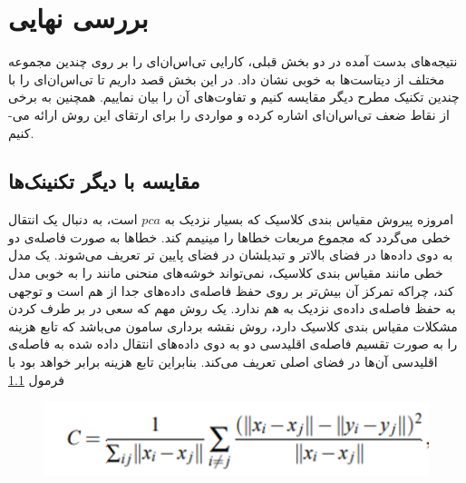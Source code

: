 \chapter{بررسی نهایی}
نتیجه‌های بدست آمده در دو بخش قبلی، کارایی تی‌اس‌ان‌ای را بر روی چندین مجموعه مختلف از دیتاست‌ها به خوبی نشان داد. در این بخش قصد داریم تا تی‌اس‌ان‌ای را با چندین تکنیک مطرح دیگر مقایسه کنیم و تفاوت‌های آن را بیان نماییم. همچنین به برخی از نقاط ضعف تی‌اس‌ان‌ای اشاره کرده و مواردی را برای ارتقای این روش ارائه می-کنیم.

\section{مقایسه با دیگر تکنینک‌ها}

امروزه پیروش
مقیاس بندی کلاسیک
که بسیار نزدیک به ‌$pca$ است، به دنبال یک انتقال خطی می‌گردد که مجموع مربعات خطاها را مینیمم کند. خطاها به صورت فاصله‌ی دو به دوی داده‌ها در فضای بالاتر و تبدیلشان در فضای پایین تر تعریف می‌شوند. یک مدل خطی مانند مقیاس بندی کلاسیک، نمی‌تواند خوشه‌های منحنی مانند را به خوبی مدل کند، چراکه تمرکز آن بیش‌تر بر روی حفظ فاصله‌ی داده‌های جدا از هم است و توجهی به حفظ فاصله‌ی داده‌ی نزدیک به هم ندارد. یک روش مهم که سعی در بر طرف کردن مشکلات مقیاس بندی کلاسیک دارد، روش نقشه برداری 
سامون 
می‌باشد که تابع هزینه را به صورت تقسیم فاصله‌ی اقلیدسی دو به دوی داده‌های انتقال داده شده به فاصله‌ی اقلیدسی آن‌ها در فضای اصلی تعریف می‌کند. بنابراین تابع هزینه برابر خواهد بود با فرمول \cref{chapfig4}
\begin{figure}
	\centering\includegraphics[scale=.6]{chapfig4.PNG}
	\caption{ }\label{chapfig4}
\end{figure}

